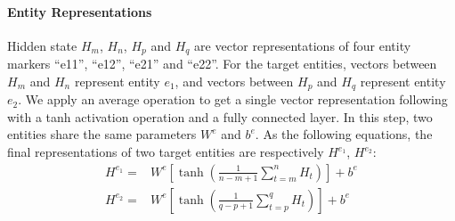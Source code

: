 \documentclass[conference]{IEEEtran}
\begin{document}
\paragraph{Entity Representations}

Hidden state \begin{math}H_{m}\end{math}, \begin{math}H_{n}\end{math}, \begin{math}H_{p}\end{math} and \begin{math}H_{q}\end{math} are vector representations of four entity markers “e11”, “e12”, “e21” and “e22”. For the target entities, vectors between \begin{math}H_{m}\end{math} and \begin{math}H_{n}\end{math} represent entity \begin{math} e_1 \end{math}, and vectors between \begin{math}H_{p}\end{math} and \begin{math}H_{q} \end{math} represent entity \begin{math} e_2 \end{math}. We apply an average operation to get a single vector representation following with a tanh activation operation and a fully connected layer. In this step, two entities share the same parameters \begin{math} W^{e} \end{math} and \begin{math} b^{e} \end{math}. As the following equations, the final representations of two target entities are respectively \begin{math} H^{e_1} \end{math},  \begin{math} H^{e_2}  \end{math}:
\begin{equation}
\begin{aligned}
H^{e_1} =&W^{e}\left[\tanh \left(\frac{1}{n-m+1} \sum_{t=m}^{n} H_{t}\right)\right]+b^{e}\\
H^{e_2} =&W^{e}\left[\tanh \left(\frac{1}{q-p+1} \sum_{t=p}^{q} H_{t}\right)\right]+b^{e}
\end{aligned}
\end{equation}
\end{document}
